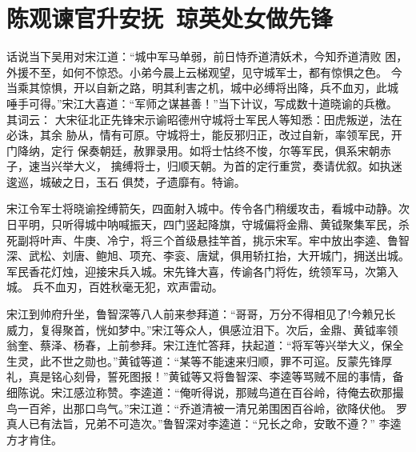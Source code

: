 \chapter{陈观谏官升安抚~琼英处女做先锋}

话说当下吴用对宋江道：“城中军马单弱，前日恃乔道清妖术，今知乔道清败
困，外援不至，如何不惊恐。小弟今晨上云梯观望，见守城军士，都有惊惧之色。
今当乘其惊惧，开以自新之路，明其利害之机，城中必缚将出降，兵不血刃，此城
唾手可得。”宋江大喜道：“军师之谋甚善！”当下计议，写成数十道晓谕的兵檄。
其词云：
大宋征北正先锋宋示谕昭德州守城将士军民人等知悉：田虎叛逆，法在必诛，其余
胁从，情有可原。守城将士，能反邪归正，改过自新，率领军民，开门降纳，定行
保奏朝廷，赦罪录用。如将士怙终不悛，尔等军民，俱系宋朝赤子，速当兴举大义，
擒缚将士，归顺天朝。为首的定行重赏，奏请优叙。如执迷逡巡，城破之日，玉石
俱焚，孑遗靡有。特谕。

宋江令军士将晓谕拴缚箭矢，四面射入城中。传令各门稍缓攻击，看城中动静。次
日平明，只听得城中呐喊振天，四门竖起降旗，守城偏将金鼎、黄钺聚集军民，杀
死副将叶声、牛庚、冷宁，将三个首级悬挂竿首，挑示宋军。牢中放出李逵、鲁智
深、武松、刘唐、鲍旭、项充、李衮、唐斌，俱用轿扛抬，大开城门，拥送出城。
军民香花灯烛，迎接宋兵入城。宋先锋大喜，传谕各门将佐，统领军马，次第入城。
兵不血刃，百姓秋毫无犯，欢声雷动。

宋江到帅府升坐，鲁智深等八人前来参拜道：“哥哥，万分不得相见了!今赖兄长
威力，复得聚首，恍如梦中。”宋江等众人，俱感泣泪下。次后，金鼎、黄钺率领
翁奎、蔡泽、杨春，上前参拜。宋江连忙答拜，扶起道：“将军等兴举大义，保全
生灵，此不世之勋也。”黄钺等道：“某等不能速来归顺，罪不可逭。反蒙先锋厚
礼，真是铭心刻骨，誓死图报！”黄钺等又将鲁智深、李逵等骂贼不屈的事情，备
细陈说。宋江感泣称赞。李逵道：“俺听得说，那贼鸟道在百谷岭，待俺去砍那撮
鸟一百斧，出那口鸟气。”宋江道：“乔道清被一清兄弟围困百谷岭，欲降伏他。
罗真人已有法旨，兄弟不可造次。”鲁智深对李逵道：“兄长之命，安敢不遵？”
李逵方才肯住。

